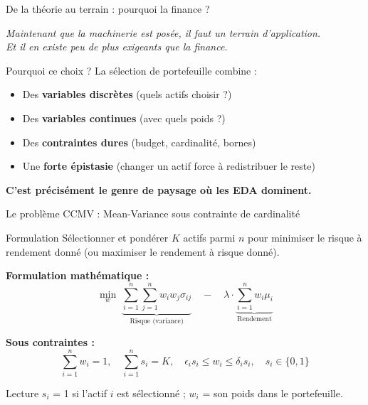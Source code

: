 \documentclass[10pt,aspectratio=169]{beamer}
\begin{document}
\begin{frame}{De la théorie au terrain : pourquoi la finance ?}
\begin{center}
\textit{Maintenant que la machinerie est posée, il faut un terrain d'application.}\\
\textit{Et il en existe peu de plus exigeants que la finance.}
\end{center}

\vspace{0.4cm}
\begin{block}{Pourquoi ce choix ?}
La sélection de portefeuille combine :
\begin{itemize}
  \item Des \textbf{variables discrètes} (quels actifs choisir ?)
  \item Des \textbf{variables continues} (avec quels poids ?)
  \item Des \textbf{contraintes dures} (budget, cardinalité, bornes)
  \item Une \textbf{forte épistasie} (changer un actif force à redistribuer le reste)
\end{itemize}
\end{block}

\vspace{0.3cm}
\centering
\textbf{C'est précisément le genre de paysage où les EDA dominent.}
\end{frame}

\begin{frame}{Le problème CCMV : Mean-Variance sous contrainte de cardinalité}
\begin{block}{Formulation}
Sélectionner et pondérer $K$ actifs parmi $n$ pour minimiser le risque à rendement donné (ou maximiser le rendement à risque donné).
\end{block}

\vspace{0.1cm}
\textbf{Formulation mathématique :}
\[
\min_{w} \; \underbrace{\sum_{i=1}^{n}\sum_{j=1}^{n} w_i w_j \sigma_{ij}}_{\text{Risque (variance)}}
\quad - \quad \lambda \cdot \underbrace{\sum_{i=1}^{n} w_i \mu_i}_{\text{Rendement}}
\]

\textbf{Sous contraintes :}
\[
\sum_{i=1}^{n} w_i = 1, \quad \sum_{i=1}^{n} s_i = K, \quad \epsilon_i s_i \leq w_i \leq \delta_i s_i, \quad s_i \in \{0,1\}
\]

\vspace{0.1cm}
\begin{exampleblock}{Lecture}
$s_i$ = 1 si l'actif $i$ est sélectionné ; $w_i$ = son poids dans le portefeuille.
\end{exampleblock}
\end{frame}
\end{document}
